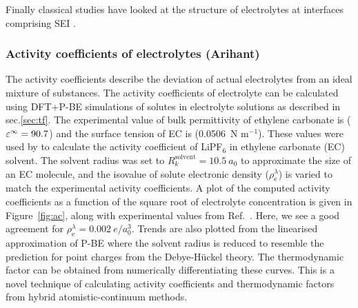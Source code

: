 \documentclass[../main.tex]{subfiles}
\begin{document}
Finally classical studies have looked at the structure of electrolytes at interfaces comprising SEI \cite{borodin_interfacial_2014}.

\subsubsection{Activity coefficients of electrolytes (Arihant)}
The activity coefficients describe the deviation of actual electrolytes from an ideal mixture of substances.\cite{Atkins2014} The activity coefficients of electrolyte can be calculated using DFT+P-BE simulations of solutes in electrolyte solutions as described in sec.\ref{sec:tf}. The experimental value of bulk permittivity of ethylene carbonate is ($\varepsilon^\infty=90.7$)\cite{Hall2015} and the surface tension of EC is (0.0506~N m$^{-1}$)\cite{Naejus2002}. These values were used by \citeauthor{Dziedzic2020} to calculate the activity coefficient of LiPF$_6$ in ethylene carbonate (EC) solvent. \cite{Dziedzic2020} The solvent radius was set to $R^\textrm{solvent}_k= 10.5~a_0$ to approximate the size of an EC molecule, and the isovalue of solute electronic density ($\rho_{\textrm{e}}^\lambda$) is varied to match the experimental activity coefficients. A plot of the computed activity coefficients as a function of the square root of electrolyte concentration is given in Figure~\ref{fig:ac}, along with experimental values from Ref.~. Here, we see a good agreement for $\rho_{\textrm{e}}^\lambda=0.002~e/a_0^3$. Trends are also plotted from the linearised approximation of P-BE where the solvent radius is reduced to resemble the prediction for point charges from the Debye-H\"uckel theory.\cite{debye1923theory} The thermodynamic factor can be obtained from numerically differentiating these curves. This is a novel technique of calculating activity coefficients and thermodynamic factors from hybrid atomistic-continuum methods.
\end{document}
